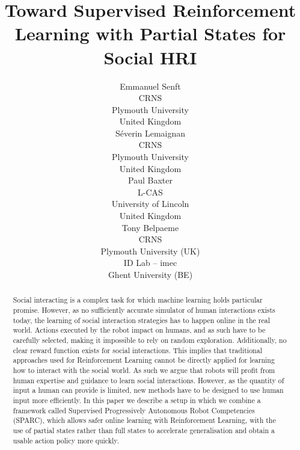 \documentclass[letterpaper]{article} %
\begin{document}
%
\title{Toward Supervised Reinforcement Learning with Partial States for Social HRI}

\author{Emmanuel Senft \\
CRNS \\
Plymouth University \\
United Kingdom\\
\And S\'{e}verin Lemaignan\\
CRNS \\
Plymouth University \\
United Kingdom\\
\And Paul Baxter\\
L-CAS\\
University of Lincoln\\
United Kingdom\\
 \And Tony Belpaeme\\
 CRNS\\ Plymouth University (UK) \\ ID Lab -- imec \\ Ghent University (BE)}

\maketitle 

\begin{abstract}

    Social interacting is a complex task for which machine learning holds
    particular promise. However, as no sufficiently accurate simulator of human
    interactions exists today, the learning of social interaction strategies has
    to happen online in the real world. Actions executed by the robot impact on
    humans, and as such have to be carefully selected, making it impossible to
    rely on random exploration. Additionally, no clear reward function exists
    for social interactions. This implies that traditional approaches used for
    Reinforcement Learning cannot be directly applied for learning how to
    interact with the social world. As such we argue that robots will profit
    from human expertise and guidance to learn social interactions. However, as the
    quantity of input a human can provide is limited, new methods have to be
    designed to use human input more efficiently. In this paper we describe a
    setup in which we combine a framework called Supervised Progressively
    Autonomous Robot Competencies (SPARC), which allows safer online learning
    with Reinforcement Learning, with the use of partial states rather than full
    states to accelerate generalisation and obtain a usable action
    policy more quickly.

\end{abstract}
\end{document}
